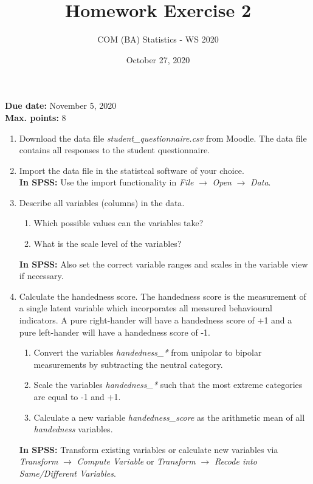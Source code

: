 \documentclass[a4paper, fleqn]{article}
\title{Homework Exercise 2}
\author{COM (BA) Statistics - WS 2020}
\date{October 27, 2020}
\begin{document}
\maketitle
\thispagestyle{empty}

\noindent
\textbf{Due date:} November 5, 2020 \\
\textbf{Max. points:} 8 \\

\begin{enumerate}
  \item Download the data file \textit{student\_questionnaire.csv} from Moodle. The data file contains all responses to the student questionnaire. 

  \vspace{1em}
  \item Import the data file in the statistcal software of your choice.\\
    \textbf{In SPSS:} Use the import functionality in \textit{File} $\rightarrow$ \textit{Open} $\rightarrow$ \textit{Data}.

  \vspace{1em}
  \item Describe all variables (columns) in the data.
  \begin{enumerate}
    \item Which possible values can the variables take?
    \item What is the scale level of the variables?
  \end{enumerate}
  \textbf{In SPSS:} Also set the correct variable ranges and scales in the variable view if necessary.  

  \vspace{1em}
  \item Calculate the handedness score. The handedness score is the measurement of a single latent variable which incorporates all measured behavioural indicators. A pure right-hander will have a handedness score of +1 and a pure left-hander will have a handedness score of -1.

  \begin{enumerate}
    \item Convert the variables \textit{handedness\_*} from unipolar to bipolar measurements by subtracting the neutral category. 
    \item Scale the variables \textit{handedness\_*} such that the most extreme categories are equal to -1 and +1.
    \item Calculate a new variable \textit{handedness\_score} as the arithmetic mean of all \textit{handedness} variables. 
  \end{enumerate}
  \textbf{In SPSS:} Transform existing variables or calculate new variables via  \textit{Transform} $\rightarrow$ \textit{Compute Variable} or \textit{Transform} $\rightarrow$ \textit{Recode into Same/Different Variables}. 


\end{enumerate}
\end{document}
